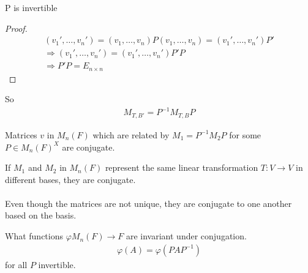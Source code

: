 \documentclass[class=scrartcl, crop=false]{standalone}
\begin{document}
\begin{note}
  P is invertible
  \begin{proof}
    \begin{gather*}
      (v_1', \dots, v_n') = (v_1, \dots, v_n)P
      (v_1, \dots, v_n) = (v_1', \dots, v_n') P' \\
      \Rightarrow (v_1', \dots, v_n') = (v_1', \dots, v_n') P' P \\
      \Rightarrow P'P = E_{n \times n}
    \end{gather*} 
  \end{proof} 
\end{note} 

So
\begin{gather*}
  M_{T, B'} = P^{-1} M_{T, B} P
\end{gather*} 
\begin{definition}
  Matrices $v$ in $M_n(F)$ which are related by $M_1 = P^{-1}M_2 P$ for some $P \in M_n(F)^X$ are conjugate.
\end{definition} 

\begin{theorem}
  If $M_1$ and $M_2$ in $M_n(F)$ represent the same linear transformation $T: V \to V$ in different bases, they are conjugate.
  \\\\
  Even though the matrices are not unique, they are conjugate to one another based on the basis.
\end{theorem} 

\begin{exercise}
  What functions $\varphi M_n(F) \to F$ are invariant under conjugation.
  \begin{gather*}
    \varphi(A) = \varphi(P A P^{-1})
  \end{gather*} for all $P$ invertible.
\end{exercise} 
\end{document}

